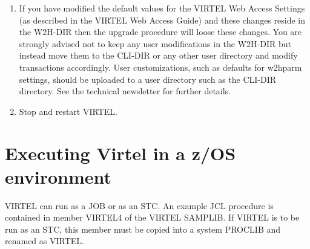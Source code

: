 \documentclass[letterpaper,10pt,english]{sphinxmanual}
\begin{document}
\begin{enumerate}
\item {} 
If you have modified the default values for the VIRTEL Web Access Settings (as described in the VIRTEL Web Access Guide) and these changes reside in the W2H-DIR then the upgrade procedure will loose these changes. You are strongly advised not to keep any user modifications in the W2H-DIR but instead move them to the CLI-DIR or any other user directory and modify transactions accordingly. User customizations, such as defaults for w2hparm settings, should be uploaded to a user directory such as the CLI-DIR directory. See the technical newsletter  for further details.

\item {} 
Stop and restart VIRTEL.

\end{enumerate}

\ignorespaces 
\newpage

\ignorespaces 
\newpage


\section{Executing Virtel in a z/OS environment}
\label{\detokenize{Installation_Guide:executing-virtel-in-a-z-os-environment}}
VIRTEL can run as a JOB or as an STC. An example JCL procedure is contained in member VIRTEL4 of the VIRTEL SAMPLIB. If VIRTEL is to be run as an STC, this member must be copied into a system PROCLIB and renamed as VIRTEL.
\end{document}
